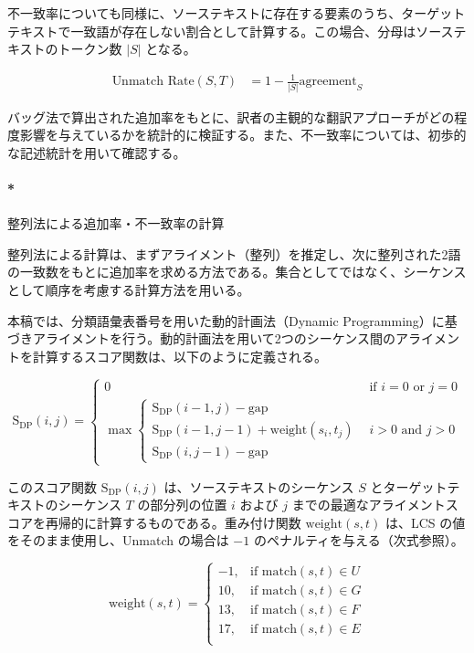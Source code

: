 \documentclass[
  letterpaper,
  DIV=11,
  numbers=noendperiod]{scrartcl}
\let\oldparagraph\paragraph
\renewcommand{\paragraph}[1]{\oldparagraph{#1}\mbox{}}
\begin{document}
不一致率についても同様に、ソーステキストに存在する要素のうち、ターゲットテキストで一致語が存在しない割合として計算する。この場合、分母はソーステキストのトークン数
\(|S|\) となる。

\[
\begin{align}
\text{Unmatch Rate}(S,T) &= 1 - \frac{1}{|S|}\text{agreement}_{S}
\end{align}
\]

バッグ法で算出された追加率をもとに、訳者の主観的な翻訳アプローチがどの程度影響を与えているかを統計的に検証する。また、不一致率については、初歩的な記述統計を用いて確認する。

\paragraph*{整列法による追加率・不一致率の計算}\label{ux6574ux5217ux6cd5ux306bux3088ux308bux8ffdux52a0ux7387ux4e0dux4e00ux81f4ux7387ux306eux8a08ux7b97}

整列法による計算は、まずアライメント（整列）を推定し、次に整列された2語の一致数をもとに追加率を求める方法である。集合としてではなく、シーケンスとして順序を考慮する計算方法を用いる。

本稿では、分類語彙表番号を用いた動的計画法（Dynamic
Programming）に基づきアライメントを行う。動的計画法を用いて2つのシーケンス間のアライメントを計算するスコア関数は、以下のように定義される。

\[
\text{S}_{\text{DP}}(i, j) =
\begin{cases}
0 & \text{if } i = 0 \text{ or } j = 0 \\
\max
\begin{cases}
\text{S}_{\text{DP}}(i-1, j) - \text{gap} \\
\text{S}_{\text{DP}}(i-1, j-1) + \text{weight}(s_i, t_j) \\
\text{S}_{\text{DP}}(i, j-1) - \text{gap}
\end{cases} & i > 0 \text{ and } j > 0
\end{cases}
\]

このスコア関数 \(\text{S}_{\text{DP}}(i,j)\)
は、ソーステキストのシーケンス \(S\) とターゲットテキストのシーケンス
\(T\) の部分列の位置 \(i\) および \(j\)
までの最適なアライメントスコアを再帰的に計算するものである。重み付け関数
\(\text{weight}(s,t)\) は、LCS の値をそのまま使用し、Unmatch の場合は
\(-1\) のペナルティを与える（次式参照）。

\[
\text{weight}(s,t) =
\begin{cases}
-1, & \text{if } \text{match}(s,t) \in U \\
10, & \text{if } \text{match}(s,t) \in G \\
13, & \text{if } \text{match}(s,t) \in F \\
17, & \text{if } \text{match}(s,t) \in E \\
\end{cases}
\]
\end{document}
